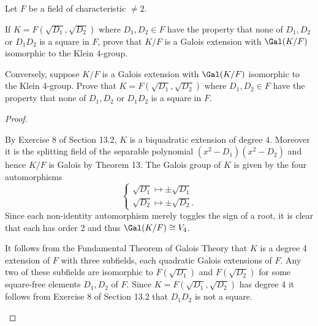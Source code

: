 \documentclass[10pt]{amsart}
\begin{document}
\begin{thm}
  \label{Ex4}
  Let $F$ be a field of characteristic $\neq 2$.
  \begin{alphaenum}
    \item
      If $K = F(\sqrt{D_1},\sqrt{D_2})$ where $D_1,D_2 \in F$ have the property that none of $D_1, D_2$ or $D_1D_2$ is a square in $F$, prove that $K/F$ is a Galois extension with $\Gal(K/F)$ isomorphic to the Klein 4-group.
    \item
      Conversely, suppose $K/F$ is a Galois extension with $\Gal(K/F)$ isomorphic to the Klein 4-group.
      Prove that $K = F(\sqrt{D_1},\sqrt{D_2})$ where $D_1,D_2 \in F$ have the property that none of $D_1,D_2$ or $D_1D_2$ is a square in $F$.
  \end{alphaenum}

  \begin{proof}
  \begin{alphaenum}
    \item
      By Exercise 8 of Section 13.2, $K$ is a biquadratic extension of degree 4.
      Moreover it is the splitting field of the separable polynomial $(x^2-D_1)(x^2-D_2)$ and hence $K/F$ is Galois by Theorem 13.
      The Galois group of $K$ is given by the four automorphisms
      $$
      \begin{cases}
        \sqrt{D_1} \longmapsto \pm\sqrt{D_1}\\
        \sqrt{D_2} \longmapsto \pm\sqrt{D_2}.
      \end{cases}
      $$
      Since each non-identity automorphism merely toggles the sign of a root, it is clear that each has order 2 and thus $\Gal(K/F) \cong V_4$.
    \item
      It follows from the Fundamental Theorem of Galois Theory that $K$ is a degree 4 extension of $F$ with three subfields, each quadratic Galois extensions of $F$.
      Any two of these subfields are isomorphic to $F(\sqrt{D_1})$ and $F(\sqrt{D_2})$ for some square-free elements $D_1,D_2$ of $F$.
      Since $K = F(\sqrt{D_1},\sqrt{D_2})$ has degree 4 it follows from Exercise 8 of Section 13.2 that $D_1D_2$ is not a square.
    \end{alphaenum}    
  \end{proof}
\end{thm}
\end{document}
